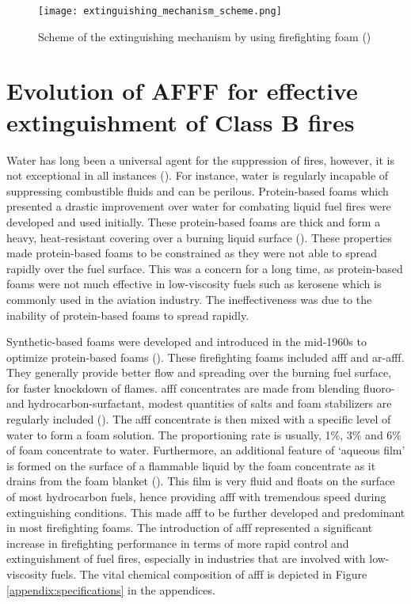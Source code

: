 \begin{figure}[H]
    \centering
    \texttt{[image: extinguishing\_mechanism\_scheme.png]}
    \caption{Scheme of the extinguishing mechanism by using firefighting foam (\cite{turekova2011environmental})}
    \label{ch2:figure:scheme}
\end{figure}

\section{Evolution of AFFF for effective extinguishment of Class B fires}
Water has long been a universal agent for the suppression of fires, however, it is not exceptional in all instances (\cite{hinnant2020characterizing}). For instance, water is regularly incapable of suppressing combustible fluids and can be perilous. Protein-based foams which presented a drastic improvement over water for combating liquid fuel fires were developed and used initially. These protein-based foams are thick and form a heavy, heat-resistant covering over a burning liquid surface (\cite{scheffey1995evaluating}). These properties made protein-based foams to be constrained as they were not able to spread rapidly over the fuel surface. This was a concern for a long time, as protein-based foams were not much effective in low-viscosity fuels such as kerosene which is commonly used in the aviation industry. The ineffectiveness was due to the inability of protein-based foams to spread rapidly. 

Synthetic-based foams were developed and introduced in the mid-1960s to optimize protein-based foams (\cite{aamodt2020review}). These firefighting foams included \acrshort{afff} and \acrshort{ar-afff}. They generally provide better flow and spreading over the burning fuel surface, for faster knockdown of flames. \acrshort{afff} concentrates are made from blending fluoro-and hydrocarbon-surfactant, modest quantities of salts and foam stabilizers are regularly included (\cite{wang2019research}). The \acrshort{afff} concentrate is then mixed with a specific level of water to form a foam solution. The proportioning rate is usually, 1\%, 3\% and 6\% of foam concentrate to water. Furthermore, an additional feature of ‘aqueous film’ is formed on the surface of a flammable liquid by the foam concentrate as it drains from the foam blanket (\cite{hinnant2020characterizing}). This film is very fluid and floats on the surface of most hydrocarbon fuels, hence providing \acrshort{afff} with tremendous speed during extinguishing conditions. This made \acrshort{afff} to be further developed and predominant in most firefighting foams. The introduction of \acrshort{afff} represented a significant increase in firefighting performance in terms of more rapid control and extinguishment of fuel fires, especially in industries that are involved with low-viscosity fuels. The vital chemical composition of \acrshort{afff} is depicted in Figure \ref{appendix:specifications} in the appendices. 


